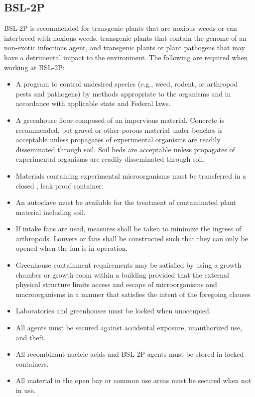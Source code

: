 \subsection{BSL-2P}
BSL-2P is recommended for transgenic plants that are noxious weeds or can interbreed with noxious weeds, transgenic plants that contain the genome of an non-exotic infectious agent, and transgenic plants or plant pathogens that may have a detrimental impact to the environment.
The following are required when working at BSL-2P:
\begin{itemize}
    \item A program to control undesired species (e.g., weed, rodent, or arthropod pests and pathogens) by methods appropriate to the organisms and in accordance with applicable state and Federal laws.
    \item A greenhouse floor composed of an impervious material. Concrete is recommended, but gravel or other porous material under benches is acceptable unless propagates of experimental organisms are readily disseminated through soil. Soil beds are acceptable unless propagates of experimental organisms are readily disseminated through soil.
    \item Materials containing experimental microorganisms must be transferred in a closed , leak proof container.
    \item An autoclave must be available for the treatment of contaminated plant material including soil.
    \item If intake fans are used, measures shall be taken to minimize the ingress of arthropods. Louvers or fans shall be constructed such that they can only be opened when the fan is in operation.
    \item Greenhouse containment requirements may be satisfied by using a growth chamber or growth room within a building provided that the external physical structure limits access and escape of microorganisms and macroorganisms in a manner that satisfies the intent of the foregoing clauses
    \item Laboratories and greenhouses must be locked when unoccupied.
    \item All agents must be secured against accidental exposure, unauthorized use, and theft.
    \item All recombinant nucleic acids and BSL-2P agents must be stored in locked containers.
    \item All material in the open bay or common use areas must be secured when not in use.
\end{itemize}
